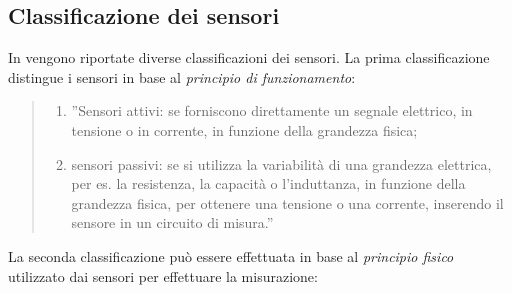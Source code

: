 \documentclass[a4paper]{report} %
\begin{document}
\subsection{Classificazione dei sensori}
In \cite{art:rif.1} vengono riportate diverse classificazioni dei sensori. La prima classificazione distingue i sensori in base al \textit{principio di funzionamento}:
\begin{quote}
	\begin{enumerate}
	\item ''Sensori attivi: se forniscono direttamente un segnale elettrico, in tensione o in corrente, in funzione della grandezza fisica;
	\item sensori passivi: se si utilizza la variabilità di una grandezza elettrica, per es. la resistenza, la capacità o l'induttanza, in funzione della grandezza fisica, per ottenere una tensione o una corrente, inserendo il sensore in un circuito di misura.''    
	\end{enumerate}
\end{quote}
La seconda classificazione può essere effettuata in base al \textit{principio fisico} utilizzato dai sensori per effettuare la misurazione:
\end{document}
